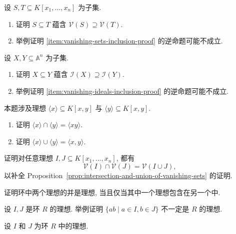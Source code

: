 \BookExerciseHeading
\begin{BookExercises}
  \item\label{ex:vanishing-sets-reverse-inclusion} 设 $S,T\subseteq K[x_{1},\ldots,x_{n}]$ 为子集.
    \begin{enumerate}[label=(\alph*),ref=(\alph*)]
      \item\label{item:vanishing-sets-inclusion-proof} 证明 $S\subseteq T$ 蕴含 $\mathcal{V}(S)\supseteq\mathcal{V}(T)$.
      \item 举例证明 \ref{item:vanishing-sets-inclusion-proof} 的逆命题可能不成立.
    \end{enumerate}
  \item\label{ex:vanishing-ideals-reverse-inclusion} 设 $X,Y\subseteq\mathbb{A}^{n}$ 为子集.
    \begin{enumerate}[label=(\alph*),ref=(\alph*)]
      \item\label{item:vanishing-ideals-inclusion-proof} 证明 $X\subseteq Y$ 蕴含 $\mathcal{I}(X)\supseteq\mathcal{I}(Y)$.
      \item 举例证明 \ref{item:vanishing-ideals-inclusion-proof} 的逆命题可能不成立.
    \end{enumerate}
  \item\label{ex:coordinate-ideals-intersection-and-generated-union} 本题涉及理想 $\langle x\rangle\subseteq K[x,y]$ 与 $\langle y\rangle\subseteq K[x,y]$.
    \begin{enumerate}[label=(\alph*)]
      \item 证明 $\langle x\rangle\cap\langle y\rangle=\langle xy\rangle$.
      \item 证明 $\langle x\rangle\cup\langle y\rangle=\langle x,y\rangle$.
    \end{enumerate}
  \item\label{ex:intersection-of-vanishing-sets} 证明对任意理想 $I,J\subseteq K[x_{1},\ldots,x_{n}]$, 都有
    \[
      \mathcal{V}(I)\cap\mathcal{V}(J)=\mathcal{V}(I\cup J),
    \]
    以补全 Proposition~\ref{prop:intersection-and-union-of-vanishing-sets} 的证明.
  \item\label{ex:when-union-of-ideals-is-ideal} 证明环中两个理想的并是理想, 当且仅当其中一个理想包含在另一个中.
  \item\label{ex:pairwise-products-need-not-be-ideal} 设 $I,J$ 是环 $R$ 的理想. 举例证明 $\{ab\mid a\in I,b\in J\}$ 不一定是 $R$ 的理想.
  \item\label{ex:ideal-sum-and-product-properties} 设 $I$ 和 $J$ 为环 $R$ 中的理想.
    \begin{enumerate}[label=(\alph*)]

\end{enumerate}
\end{BookExercises}
